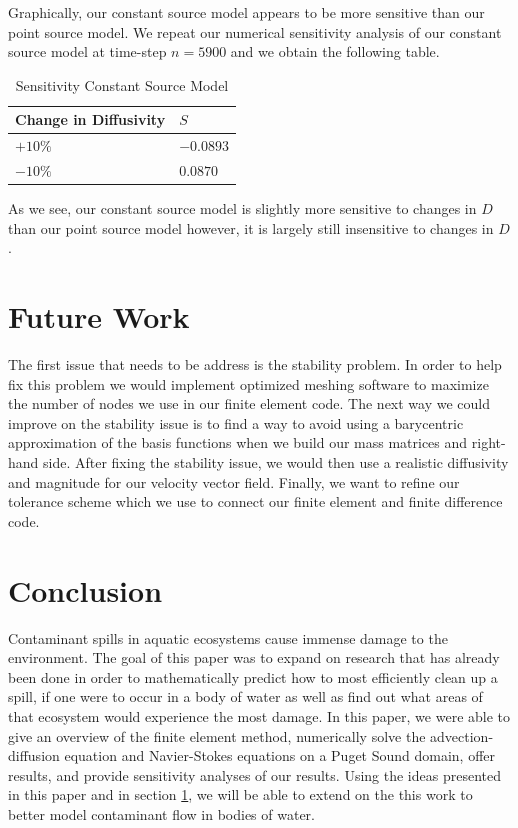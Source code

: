 \documentclass[a4paper]{article}
\theoremstyle{remark}
\theoremstyle{remark}
\begin{document}
Graphically, our constant source model appears to be more sensitive than our point source model. We repeat our numerical sensitivity analysis of our constant source model at time-step $n=5900$ and we obtain the following table.

\begin{table}[H]
\centering
\caption{Sensitivity Constant Source Model}
\label{sensitivitymodel2}
\begin{tabular}{|l|l|}
\hline
Change in Diffusivity           & $S$ \\ \hline
$+10\%$    & $-0.0893$              \\ \hline
$-10\%$   & $0.0870$              \\ \hline
\end{tabular}
\end{table}

\noindent As we see, our constant source model is slightly more sensitive to changes in $D$ than our point source model however, it is largely still insensitive to changes in $D$.

\section{Future Work} \label{futureworksection}
The first issue that needs to be address is the stability problem. In order to help fix this problem we would implement optimized meshing software to maximize the number of nodes we use in our finite element code. The next way we could improve on the stability issue is to find a way to avoid using a barycentric approximation of the basis functions when we build our mass matrices and right-hand side. After fixing the stability issue, we would then use a realistic diffusivity and magnitude for our velocity vector field. Finally, we want to refine our tolerance scheme which we use to connect our finite element and finite difference code.

\section{Conclusion} \label{conclusionsection}
Contaminant spills in aquatic ecosystems cause immense damage to the environment. The goal of this paper was to expand on research that has already been done in order to mathematically predict how to most efficiently clean up a spill, if one were to occur in a body of water as well as find out what areas of that ecosystem would experience the most damage. In this paper, we were able to give an overview of the finite element method, numerically solve the advection-diffusion equation and Navier-Stokes equations on a Puget Sound domain, offer results, and provide sensitivity analyses of our results. Using the ideas presented in this paper and in section \ref{futureworksection}, we will be able to extend on the this work to better model contaminant flow in bodies of water.
\newpage
\end{document}
